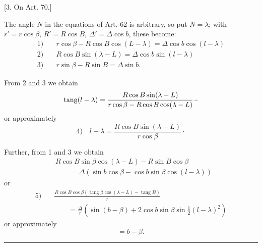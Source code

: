 \begin{center}
[3. On Art. 70.]
\end{center}
The angle \(N\) in the equations of Art. 62 is arbitrary, so put \(N=\lambda\); with \(r'=r\cos\beta\), \(R'=R\cos B\), \(\Delta'=\Delta\cos b\), these become:
\[
\begin{aligned}
1)\quad&r\cos\beta-R\cos B\cos(L-\lambda)=\Delta\cos b\cos(l-\lambda)\\
2)\quad&R\cos B\sin(\lambda-L)=\Delta\cos b\sin(l-\lambda)\\
3)\quad&r\sin\beta-R\sin B=\Delta\sin b.
\end{aligned}
\]

From 2 and 3 we obtain
\[
\operatorname{tang}(l-\lambda)=\frac{R\cos B\sin(\lambda-L)}{r\cos\beta-R\cos B\cos(\lambda-L)}\,\mathpunct{\vcenter{\hbox{\rule{.45em}{.35pt}}}}
\]
or approximately
\[
4)\quad l-\lambda=\frac{R\cos B\sin(\lambda-L)}{r\cos\beta}\mathpunct{\cdot}
\]

Further, from 1 and 3 we obtain
\[
\begin{aligned}
&R\cos B\sin\beta\cos(\lambda-L)-R\sin B\cos\beta\\
&\qquad=\Delta(\sin b\cos\beta-\cos b\sin\beta\cos(l-\lambda))
\end{aligned}
\]
or
\[
\begin{aligned}
5)\quad&\frac{R\cos B\cos\beta(\operatorname{tang}\beta\cos(\lambda-L)-\operatorname{tang}B)}{r}\\
&\qquad=\frac{\Delta}{r}(\sin(b-\beta)+2\cos b\sin\beta\sin\tfrac12(l-\lambda)^2)
\end{aligned}
\]
or approximately
\[
=b-\beta.
\]
\begin{center}\rule{.18\textwidth}{.35pt}\end{center}
